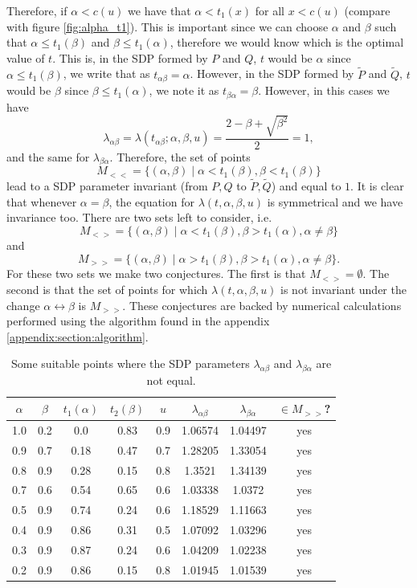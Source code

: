 \documentclass[10pt, a4paper]{amsart}
\begin{document}
Therefore, if $\alpha < c(u)$ we have that $\alpha < t_{1}(x)$ for all $x < c(u)$ (compare with figure \ref{fig:alpha_t1}). This is important since we can choose $\alpha $ and $\beta $ such that $\alpha \leq t_{1}(\beta)$ and $\beta \leq t_{1}(\alpha)$, therefore we would know which is the optimal value of $t$. This is, in the SDP formed by $P$ and $Q$, $t$ would be $\alpha$ since $\alpha \leq t_{1}(\beta)$, we write that as $t_{\alpha\beta} = \alpha$. However, in the SDP formed by $\tilde{P}$ and $\tilde{Q}$, $t$ would be $\beta$ since $\beta \leq t_{1}(\alpha)$, we note it as $t_{\beta\alpha} = \beta$. However, in this cases we have 
$$
\lambda_{\alpha\beta} = \lambda(t_{\alpha\beta};\alpha, \beta, u) =     \dfrac{2-\beta+ \sqrt{\beta^{2}}}{2} = 1,     
$$
and the same for $\lambda_{\beta\alpha}$. Therefore, the set of points 
$$
M_{<<} = \{(\alpha,\beta)\mid \alpha <t_{1}(\beta) , \beta < t_{1}(\beta)\}
$$
lead to a SDP parameter invariant (from $P,Q$ to $\tilde{P}, \tilde{Q}$) and equal to $1$. It is clear that whenever $\alpha = \beta$, the equation for $\lambda(t,\alpha,\beta,u)$ is symmetrical and we have invariance too. There are two sets left to consider, i.e. 
$$
M_{<>}  = \{(\alpha,\beta) \mid \alpha < t_{1}(\beta) , \beta > t_{1}(\alpha), \alpha \neq \beta\}
$$
and 
$$
M_{>>} = \{(\alpha, \beta)\mid \alpha > t_{1}(\beta) , \beta > t_{1}(\alpha),\alpha\neq \beta\}.
$$
For these two sets we make two conjectures. The first is that $M_{<>} = \emptyset$. The second is that the set of points for which $\lambda(t, \alpha, \beta, u)$ is not invariant under the change  $\alpha \leftrightarrow \beta$ is $M_{>>}$. These conjectures are backed by numerical calculations performed using the algorithm found in the appendix \ref{appendix:section:algorithm}. 

\begin{table}[h]
\centering
\caption{Some suitable points where the SDP parameters $\lambda_{\alpha\beta}$ and $\lambda_{\beta\alpha}$ are not equal.}
\label{table:suitable_points}
\begin{tabular}{cccccccc}
\toprule
 $\alpha$ & $\beta$ & $t_{1}(\alpha)$ & $t_{2}(\beta)$ & $u$ &$\lambda_{\alpha\beta}$&$\lambda_{\beta\alpha}$& $\in M_{>>}$? \\
 \midrule
  1.0 & 0.2 & 0.0 & 0.83 & 0.9 & 1.06574 & 1.04497 & yes \\
\hline 0.9 & 0.7 & 0.18 & 0.47 & 0.7 & 1.28205 & 1.33054 & yes \\
\hline 0.8 & 0.9 & 0.28 & 0.15 & 0.8 & 1.3521 & 1.34139 & yes \\
\hline 0.7 & 0.6 & 0.54 & 0.65 & 0.6 & 1.03338 & 1.0372 & yes \\
\hline 0.5 & 0.9 & 0.74 & 0.24 & 0.6 & 1.18529 & 1.11663 & yes \\
\hline 0.4 & 0.9 & 0.86 & 0.31 & 0.5 & 1.07092 & 1.03296 & yes \\
\hline 0.3 & 0.9 & 0.87 & 0.24 & 0.6 & 1.04209 & 1.02238 & yes \\
\hline 0.2 & 0.9 & 0.86 & 0.15 & 0.8 & 1.01945 & 1.01539 & yes \\
\bottomrule
\end{tabular}
\end{table}
\end{document}
